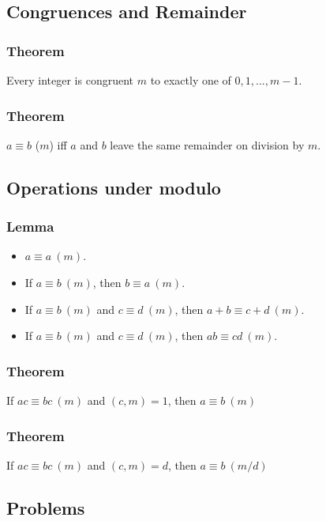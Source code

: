 \documentclass{article}
\begin{document}
\subsection{Congruences and Remainder}
\subsubsection{Theorem}
Every integer is congruent $m$ to exactly one of $0, 1, ... , m-1$.
\vspace{40px}

\subsubsection{Theorem}
$a \equiv b$ ($m$) iff $a$ and $b$ leave the same remainder on division by $m$.
\vspace{40px}

\subsection{Operations under modulo}
\subsubsection{Lemma}
\begin{itemize}
    \item $a \equiv a \ (m)$.
    \item If $a \equiv b \ (m)$, then $b \equiv a \ (m)$.
    \item If $a \equiv b \ (m)$ and $c \equiv d \ (m)$, then $a+b \equiv c+d \ (m)$.
    \item If $a \equiv b \ (m)$ and $c \equiv d \ (m)$, then $ab \equiv cd \ (m)$.
\end{itemize}
\vspace{60px}
\subsubsection{Theorem}
If $ac \equiv bc \ (m)$ and $(c,m)=1$, then $a \equiv b \ (m)$
\vspace{50px}
\subsubsection{Theorem}
If $ac \equiv bc \ (m)$ and $(c,m)=d$, then $a \equiv b \ (m/d)$
\vspace{50px}
\subsection{Problems}
\end{document}
